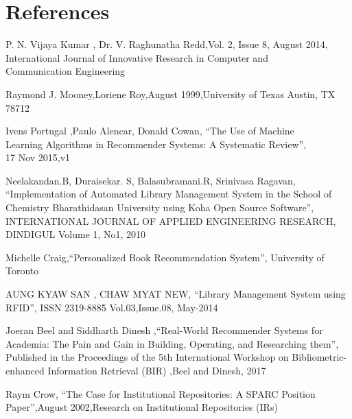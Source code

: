 \documentclass[a4paper,12pt]{report}
\begin{document}
\chapter{References}
\begin{enumerate}[label={[\arabic*]}]

    \item P. N. Vijaya Kumar , Dr. V. Raghunatha Redd,Vol. 2, Issue 8, August 2014,
    International Journal of Innovative Research in Computer and \\
    Communication Engineering

    \item Raymond J. Mooney,Loriene Roy,August 1999,University of Texas Austin, TX 78712

    \item Ivens Portugal ,Paulo Alencar, Donald Cowan, ``The Use of Machine \\
    Learning Algorithms in Recommender Systems: A Systematic Review'',\\
    17 Nov 2015,v1

    \item Neelakandan.B, Duraisekar. S, Balasubramani.R, Srinivasa Ragavan,\\
    ``Implementation of Automated Library Management System in the School
    of Chemistry Bharathidasan University using Koha Open Source Software'',
    INTERNATIONAL JOURNAL OF APPLIED ENGINEERING RESEARCH, DINDIGUL Volume 1,
     No1, 2010

    \item Michelle Craig,{``Personalized Book Recommendation System''},
    University of Toronto

    \item AUNG KYAW SAN , CHAW MYAT NEW, {``Library Management System using RFID''},
    ISSN 2319-8885 Vol.03,Issue.08, May-2014

    \item Joeran Beel and Siddharth Dinesh ,{``Real-World Recommender Systems for \\
    Academia: The Pain and Gain in Building, Operating, and Researching them''},
    Published in the Proceedings of the 5th International Workshop on
    Bibliometric-enhanced Information Retrieval (BIR) ,Beel and Dinesh, 2017

    \pagebreak

    \item Raym Crow, {``The Case for Institutional Repositories: A SPARC Position
    Paper''},August 2002,Research on Institutional Repositories (IRs)


\end{enumerate}
\end{document}
